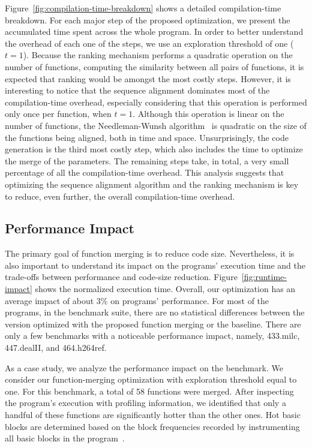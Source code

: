 Figure~\ref{fig:compilation-time-breakdown} shows a detailed compilation-time
breakdown.
For each major step of the proposed optimization, we present the accumulated
time spent across the whole program.
In order to better understand the overhead of each one of the steps, we use
an exploration threshold of one ($t = 1$).
Because the ranking mechanism performs a quadratic operation on the number of
functions, computing the similarity between all pairs of functions, it is
expected that ranking would be amongst the most costly steps.
However, it is interesting to notice that the sequence alignment dominates most
of the compilation-time overhead, especially considering that this operation is
performed only once per function, when $t = 1$.
Although this operation is linear on the number of functions, the
Needleman-Wunsh algorithm~\cite{needleman70} is quadratic on the size of the
functions being aligned, both in time and space.
Unsurprisingly, the code generation is the third most costly step, which also
includes the time to optimize the merge of the parameters.
The remaining steps take, in total, a very small percentage of all the
compilation-time overhead.
This analysis suggests that optimizing the sequence alignment algorithm and
the ranking mechanism is key to reduce, even further, the overall
compilation-time overhead.

\vspace{-1ex}
\subsection{Performance Impact}


The primary goal of function merging is to reduce code size.
Nevertheless, it is also important to understand its impact on the programs'
execution time and the trade-offs between performance and code-size reduction.
Figure~\ref{fig:runtime-impact} shows the normalized execution time.
Overall, our optimization has an average impact of about 3\% on programs' performance.
For most of the programs, in the benchmark suite, there are no
statistical differences between the version optimized with the proposed function
merging or the baseline.
There are only a few benchmarks with a noticeable performance impact, namely,
433.milc, 447.dealII, and 464.h264ref.

As a case study, we analyze the performance impact on the 
benchmark.
We consider our function-merging optimization with exploration threshold equal
to one.
For this benchmark, a total of 58 functions were merged.
After inspecting the program's execution with profiling information, we
identified that only a handful of these functions are significantly hotter than
the other ones.
Hot basic blocks are determined based on the block frequencies recorded by
instrumenting all basic blocks in the program~\cite{ball94}.

